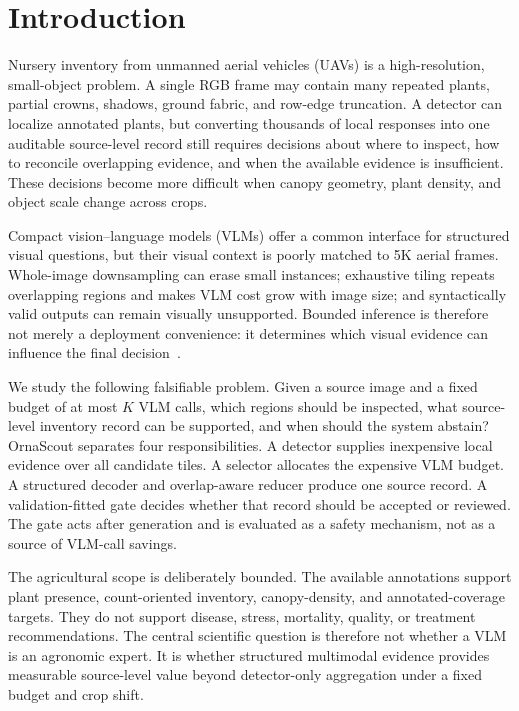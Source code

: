 \section{Introduction}
Nursery inventory from unmanned aerial vehicles (UAVs) is a high-resolution, small-object problem. A single RGB frame may contain many repeated plants, partial crowns, shadows, ground fabric, and row-edge truncation. A detector can localize annotated plants, but converting thousands of local responses into one auditable source-level record still requires decisions about where to inspect, how to reconcile overlapping evidence, and when the available evidence is insufficient. These decisions become more difficult when canopy geometry, plant density, and object scale change across crops.

Compact vision--language models (VLMs) offer a common interface for structured visual questions, but their visual context is poorly matched to 5K aerial frames. Whole-image downsampling can erase small instances; exhaustive tiling repeats overlapping regions and makes VLM cost grow with image size; and syntactically valid outputs can remain visually unsupported. Bounded inference is therefore not merely a deployment convenience: it determines which visual evidence can influence the final decision~\cite{kode2026drone}.

We study the following falsifiable problem. Given a source image and a fixed budget of at most $K$ VLM calls, which regions should be inspected, what source-level inventory record can be supported, and when should the system abstain? OrnaScout separates four responsibilities. A detector supplies inexpensive local evidence over all candidate tiles. A selector allocates the expensive VLM budget. A structured decoder and overlap-aware reducer produce one source record. A validation-fitted gate decides whether that record should be accepted or reviewed. The gate acts after generation and is evaluated as a safety mechanism, not as a source of VLM-call savings.

The agricultural scope is deliberately bounded. The available annotations support plant presence, count-oriented inventory, canopy-density, and annotated-coverage targets. They do not support disease, stress, mortality, quality, or treatment recommendations. The central scientific question is therefore not whether a VLM is an agronomic expert. It is whether structured multimodal evidence provides measurable source-level value beyond detector-only aggregation under a fixed budget and crop shift.

